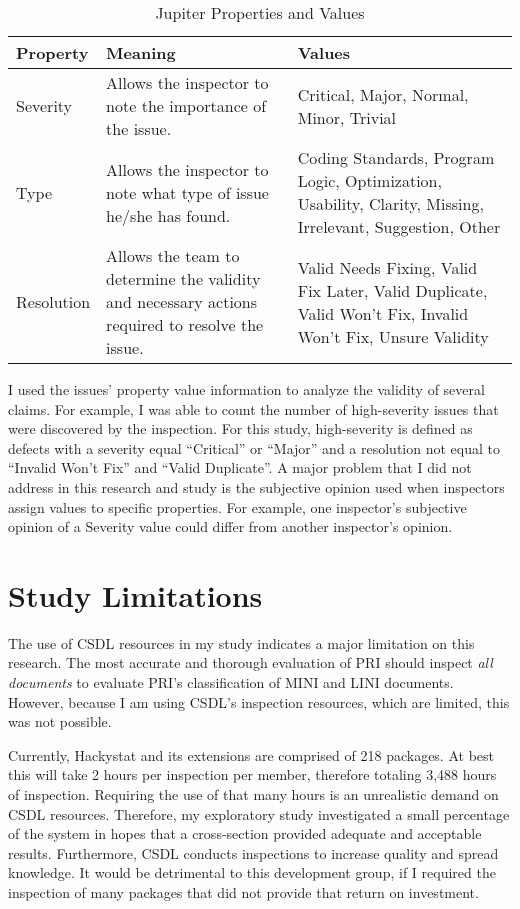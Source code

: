\begin{table}[htbp]
  \begin{center}
    \caption{Jupiter Properties and Values}
    \label{tab:jupiter-properties}
    \begin{tabular}{|p{2.0cm}|p{6.0cm}|p{5.0cm}|} \hline
      {\bf Property} & {\bf Meaning} & {\bf Values} \\ \hline

Severity & Allows the inspector to note the importance of the issue. &
Critical, Major, Normal, Minor, Trivial \\ \hline 
Type & Allows the inspector to note what type of issue he/she has found. &
Coding Standards, Program Logic, Optimization, Usability, Clarity, 
Missing, Irrelevant, Suggestion, Other \\ \hline 
Resolution & Allows the team to determine the validity and necessary
actions required to resolve the issue. & Valid Needs Fixing, Valid Fix
Later, Valid Duplicate, Valid Won't Fix, Invalid Won't Fix, Unsure Validity
\\ \hline 
    \end{tabular}
  \end{center}
\end{table}

I used the issues' property value information to analyze the validity of
several claims. For example, I was able to count the number of
high-severity issues that were discovered by the inspection. For this
study, high-severity is defined as defects with a severity equal
``Critical'' or ``Major'' and a resolution not equal to ``Invalid Won't
Fix'' and ``Valid Duplicate''. A major problem that I did not address in
this research and study is the subjective opinion used when inspectors
assign values to specific properties. For example, one inspector's
subjective opinion of a Severity value could differ from another
inspector's opinion.



\section{Study Limitations}
The use of CSDL resources in my study indicates a major limitation on this
research. The most accurate and thorough evaluation of PRI should inspect
\textit{all documents} to evaluate PRI's classification of MINI and LINI
documents. However, because I am using CSDL's inspection resources, which
are limited, this was not possible.

Currently, Hackystat and its extensions are comprised of 218 packages. At
best this will take 2 hours per inspection per member, therefore totaling
3,488 hours of inspection. Requiring the use of that many hours is an
unrealistic demand on CSDL resources. Therefore, my exploratory study
investigated a small percentage of the system in hopes that a cross-section
provided adequate and acceptable results. Furthermore, CSDL conducts
inspections to increase quality and spread knowledge. It would be
detrimental to this development group, if I required the inspection of many
packages that did not provide that return on investment.

